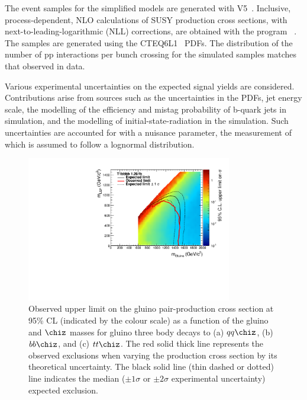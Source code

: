 The event samples for the simplified models are generated 
with \MADGRAPH V5~\cite{madgraph}.
Inclusive, process-dependent, NLO
calculations of SUSY production cross sections, with
next-to-leading-logarithmic (NLL) corrections, are obtained with the
program \PROSPINO~\cite{Beenakker:1996ch, PhysRevD.80.095004,PhysRevLett.102.111802, PhysRevD.80.095004, 1126-6708-2009-12-041,
  doi:10.1142/S0217751X11053560, susy-nlo-nll}. The samples are
generated using the CTEQ6L1~\cite{Pumplin:2002vw} PDFs. The
distribution of the number of pp interactions per bunch crossing for
the simulated samples matches that observed in data.

Various experimental uncertainties on the expected signal yields are
considered. Contributions arise from sources such as the uncertainties in the PDFs, jet energy
scale, the modelling of the efficiency and mistag probability of
b-quark jets in simulation, and the modelling of initial-state-radiation in the simulation.
Such uncertainties are accounted for with a nuisance parameter, the measurement 
of which is assumed to follow a lognormal distribution.

\begin{figure}[tbhp]

  \begin{center}
    \includegraphics[width=0.8\textwidth]{xs_contour_withHisto.pdf}
    \caption{Observed upper limit on the gluino pair-production cross section at 95\% CL (indicated by the colour scale) as a function of the gluino
      and $\chiz$ masses for gluino three body decays to (a) $qq\chiz$, (b) $bb\chiz$, and (c) $tt\chiz$.
      The red solid thick line represents the observed exclusions when
      varying the production cross section by its theoretical uncertainty. 
      The black solid line (thin dashed
      or dotted) line indicates the median (${\pm}1 \sigma$ or ${\pm}2
      \sigma$ experimental uncertainty) expected exclusion.
      \label{fig:limits-sms} }
  \end{center}
\end{figure}


